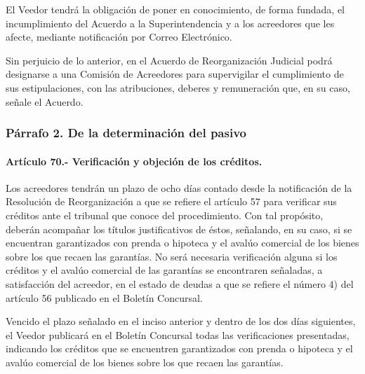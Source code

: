 \documentclass[
]{book}
\begin{document}
El Veedor tendrá la obligación de poner en conocimiento, de forma fundada, el incumplimiento del Acuerdo a la Superintendencia y a los acreedores que les afecte, mediante notificación por Correo Electrónico.

Sin perjuicio de lo anterior, en el Acuerdo de Reorganización Judicial podrá designarse a una Comisión de Acreedores para supervigilar el cumplimiento de sus estipulaciones, con las atribuciones, deberes y remuneración que, en su caso, señale el Acuerdo.

\hypertarget{puxe1rrafo-2.-de-la-determinaciuxf3n-del-pasivo}{%
\subsubsection*{Párrafo 2. De la determinación del pasivo}\label{puxe1rrafo-2.-de-la-determinaciuxf3n-del-pasivo}}

\hypertarget{artuxedculo-70.--verificaciuxf3n-y-objeciuxf3n-de-los-cruxe9ditos.}{%
\paragraph*{Artículo 70.- Verificación y objeción de los créditos.}\label{artuxedculo-70.--verificaciuxf3n-y-objeciuxf3n-de-los-cruxe9ditos.}}

Los acreedores tendrán un plazo de ocho días contado desde la notificación de la Resolución de Reorganización a que se refiere el artículo 57 para verificar sus créditos ante el tribunal que conoce del procedimiento. Con tal propósito, deberán acompañar los títulos justificativos de éstos, señalando, en su caso, si se encuentran garantizados con prenda o hipoteca y el avalúo comercial de los bienes sobre los que recaen las garantías. No será necesaria verificación alguna si los créditos y el avalúo comercial de las garantías se encontraren señaladas, a satisfacción del acreedor, en el estado de deudas a que se refiere el número 4) del artículo 56 publicado en el Boletín Concursal.

Vencido el plazo señalado en el inciso anterior y dentro de los dos días siguientes, el Veedor publicará en el Boletín Concursal todas las verificaciones presentadas, indicando los créditos que se encuentren garantizados con prenda o hipoteca y el avalúo comercial de los bienes sobre los que recaen las garantías.
\end{document}
